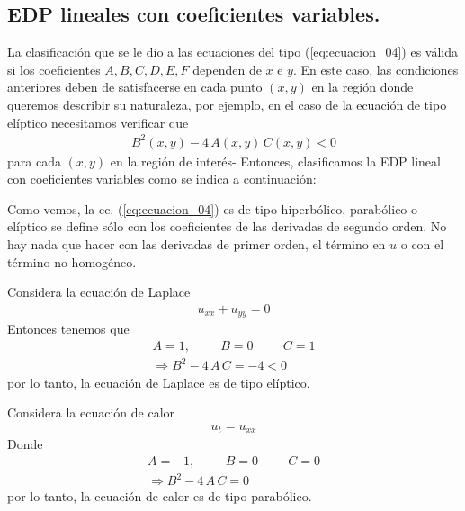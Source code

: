 \subsection{EDP lineales con coeficientes variables.}
La clasificación que se le dio a las ecuaciones del tipo (\ref{eq:ecuacion_04}) es válida si los coeficientes $A, B, C, D, E, F$ dependen de $x$ e $y$. En este caso, las condiciones anteriores deben de satisfacerse en cada punto $(x, y)$ en la región donde queremos describir su naturaleza, por ejemplo, en el caso de la ecuación de tipo elíptico necesitamos verificar que
\begin{align*}
B^{2} (x, y) - 4 \, A (x, y) \, C (x, y) < 0
\end{align*}
para cada $(x, y)$ en la región de interés- Entonces, clasificamos la EDP lineal con coeficientes variables como se indica a continuación:
\begin{center}
\end{center}
Como vemos, la ec. (\ref{eq:ecuacion_04}) es de tipo hiperbólico, parabólico o elíptico se define sólo con los coeficientes de las derivadas de segundo orden. No hay nada que hacer con las derivadas de primer orden, el término en $u$ o con el término no homogéneo.
\begin{ejemplo}
Considera la ecuación de Laplace
\begin{align*}
u_{xx} + u_{yy} = 0
\end{align*}
Entonces tenemos que
\begin{align*}
A = 1, \hspace{1cm} B = 0 \hspace{1cm} C = 1 \\
\Rightarrow B^{2} - 4 \, A \, C = - 4 < 0
\end{align*}
por lo tanto, la ecuación de Laplace es de tipo elíptico.
\end{ejemplo}
\begin{ejemplo}
Considera la ecuación de calor
\begin{align*}
u_{t} = u_{xx}
\end{align*}
Donde
\begin{align*}
A = -1, \hspace{1cm} B = 0 \hspace{1cm} C = 0 \\
\Rightarrow B^{2} - 4 \, A \, C = 0
\end{align*}
por lo tanto, la ecuación de calor es de tipo parabólico.
\end{ejemplo}
